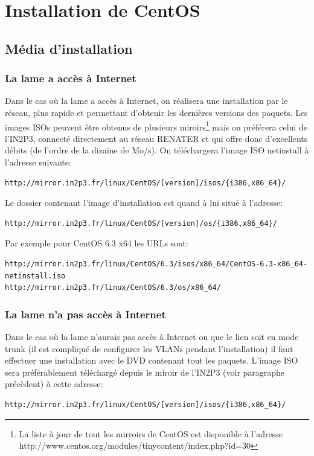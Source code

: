 \documentclass[a4paper,oneside]{report}
\begin{document}
\section{Installation de CentOS} \label{sec:installcentos}
\subsection{Média d'installation} \label{sec:installmediacentos}
\subsubsection{La lame a accès à Internet}
Dans le cas où la lame a accès à Internet, on réalisera une installation par le réseau, plus rapide et permettant d'obtenir les dernières versions des paquets.
Les images ISOs peuvent être obtenus de plusieurs miroirs\footnote{La liste à jour de tout les mirroirs de CentOS est disponible à l'adresse http://www.centos.org/modules/tinycontent/index.php?id=30} mais on préférera celui de l'IN2P3, connecté directement au réseau RENATER et qui offre donc d'excellents débits (de l'ordre de la dizaine de Mo/s).\newline
On téléchargera l'image ISO netinstall à l'adresse suivante:
\begin{verbatim}
http://mirror.in2p3.fr/linux/CentOS/[version]/isos/{i386,x86_64}/
\end{verbatim}

\noindent Le dossier contenant l'image d'installation est quand à lui situé à l'adresse:
\begin{verbatim}
http://mirror.in2p3.fr/linux/CentOS/[version]/os/{i386,x86_64}/
\end{verbatim}

\noindent Par exemple pour CentOS 6.3 x64 les URLs sont:
\begin{verbatim}
http://mirror.in2p3.fr/linux/CentOS/6.3/isos/x86_64/CentOS-6.3-x86_64-netinstall.iso
http://mirror.in2p3.fr/linux/CentOS/6.3/os/x86_64/
\end{verbatim}

\subsubsection{La lame n'a pas accès à Internet}
Dans le cas où la lame n'aurais pas accès à Internet ou que le lien soit en mode trunk (il est compliqué de configurer les VLANs pendant l'installation) il faut effectuer une installation avec le DVD contenant tout les paquets.\newline
L'image ISO sera préférablement téléchargé depuis le miroir de l'IN2P3 (voir paragraphe précèdent) à cette adresse:
\begin{verbatim}
http://mirror.in2p3.fr/linux/CentOS/[version]/isos/{i386,x86_64}/
\end{verbatim}
\end{document}
